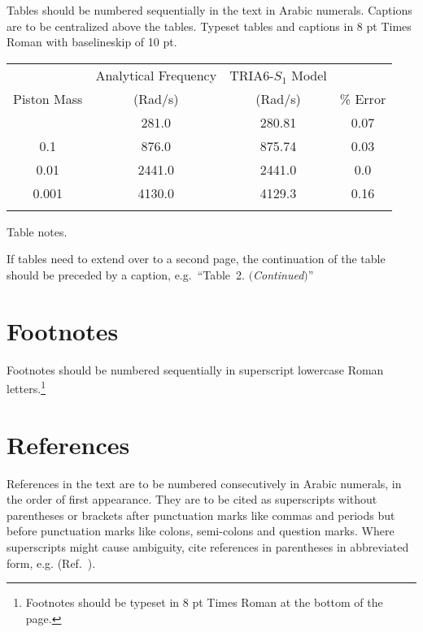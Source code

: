 \documentclass{ws-ijait}
\begin{document}
Tables should be numbered sequentially in the text in Arabic
numerals. Captions are to be centralized above the tables.
Typeset tables and captions in 8 pt Times Roman with
baselineskip of 10 pt.

\begin{table}
{\begin{tabular}{@{}cccc@{}} \toprule
& Analytical Frequency & TRIA6-$S_1$ Model\\
Piston Mass & (Rad/s) & (Rad/s) & \% Error \\ \colrule
1.0\hphantom{00} & \hphantom{0}281.0 & \hphantom{0}280.81 & 0.07 \\
0.1\hphantom{00} & \hphantom{0}876.0 & \hphantom{0}875.74 & 0.03 \\
0.01\hphantom{0} & 2441.0 & 2441.0\hphantom{0} & 0.0\hphantom{0} \\
0.001 & 4130.0 & 4129.3\hphantom{0} & 0.16\\ \botrule
\end{tabular}}
\begin{tabnote}
Table notes.
\end{tabnote}
\end{table}

If tables need to extend over to a second page, the continuation
of the table should be preceded by a caption,
e.g.~``Table~2. $(${\it Continued}$)$''

\section{Footnotes}

Footnotes should be numbered sequentially in superscript
lowercase Roman letters.\footnote{Footnotes should be
typeset in 8 pt Times Roman at the bottom of the page.}

\section*{References}


References in the text are to be numbered consecutively in Arabic
numerals, in the order of first appearance. They are to be cited as
superscripts without parentheses or brackets after punctuation marks
like commas and periods but before punctuation marks like colons,
semi-colons and question marks. Where superscripts might cause
ambiguity, cite references in parentheses in abbreviated form,
e.g. (Ref.~).
\end{document}
